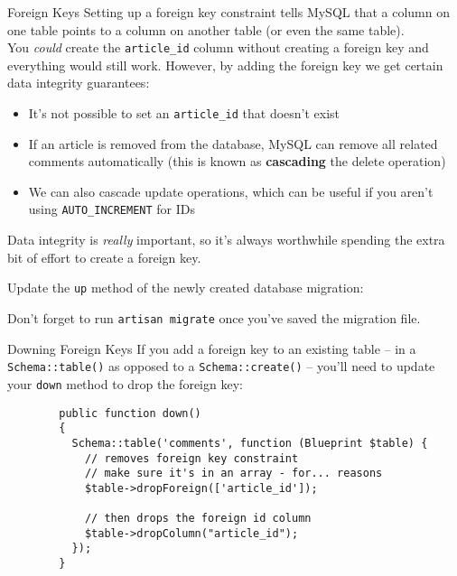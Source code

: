 \begin{infobox}{Foreign Keys}
    Setting up a foreign key constraint tells MySQL that a column on one table points to a column on another table (or even the same table).
    \\

    You \textit{could} create the \texttt{article\_id} column without creating a foreign key and everything would still work. However, by adding the foreign key we get certain data integrity guarantees:

    \begin{itemize}
        \item It's not possible to set an \texttt{article\_id} that doesn't exist
        \item If an article is removed from the database, MySQL can remove all related comments automatically (this is known as \textbf{cascading} the delete operation)
        \item We can also cascade update operations, which can be useful if you aren't using \texttt{AUTO\_INCREMENT} for IDs
    \end{itemize}

    Data integrity is \textit{really} important, so it's always worthwhile spending the extra bit of effort to create a foreign key.
\end{infobox}

Update the \texttt{up} method of the newly created database migration:


Don't forget to run \texttt{artisan migrate} once you've saved the migration file.

\begin{infobox}{Downing Foreign Keys}
    If you add a foreign key to an existing table – in a \texttt{Schema::table()} as opposed to a \texttt{Schema::create()} – you'll need to update your \texttt{down} method to drop the foreign key:

    \begin{verbatim}
        public function down()
        {
          Schema::table('comments', function (Blueprint $table) {
            // removes foreign key constraint
            // make sure it's in an array - for... reasons
            $table->dropForeign(['article_id']);

            // then drops the foreign id column
            $table->dropColumn("article_id");
          });
        }
    \end{verbatim}
\end{infobox}


